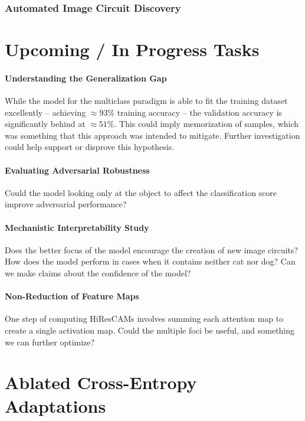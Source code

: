 \documentclass{article}
\theoremstyle{plain}
\theoremstyle{definition}
\theoremstyle{remark}
\begin{document}
\subsubsection{Automated Image Circuit Discovery}

\section{Upcoming / In Progress Tasks} 

\paragraph{Understanding the Generalization Gap} While the model for the multiclass paradigm is able to fit the training dataset excellently -- achieving $\approx 93\%$ training accuracy -- the validation accuracy is significantly behind at $\approx 51\%$. This could imply memorization of samples, which was something that this approach was intended to mitigate. Further investigation could help support or disprove this hypothesis.

\paragraph{Evaluating Adversarial Robustness} Could the model looking only at the object to affect the classification score improve adversarial performance?

\paragraph{Mechanistic Interpretability Study} Does the better focus of the model encourage the creation of new image circuits? How does the model perform in cases when it contains neither cat nor dog? Can we make claims about the confidence of the model?

\paragraph{Non-Reduction of Feature Maps} One step of computing HiResCAMs involves summing each attention map to create a single activation map. Could the multiple foci be useful, and something we can further optimize?




\appendix

\section{Ablated Cross-Entropy Adaptations}
\end{document}
